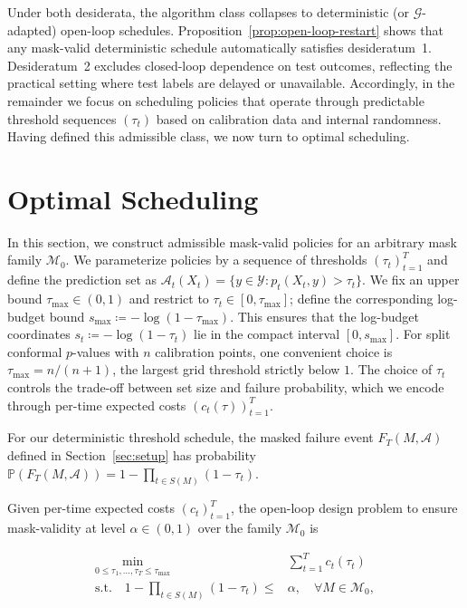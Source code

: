 \documentclass{uai2026} %
\newcommand{\1}{\mathbf{1}}
\newcommand{\prob}{\mathbb{P}}
\newcommand{\ycal}{\mathcal{Y}}
\newcommand{\G}{\mathcal{G}}
\newcommand{\mcal}{\mathcal{M}}
\newcommand{\acal}{\mathcal{A}}
\begin{document}
Under both desiderata, the algorithm class collapses to deterministic (or $\G$-adapted) open-loop schedules.
Proposition~\ref{prop:open-loop-restart} shows that any mask-valid deterministic schedule automatically satisfies desideratum~1.
Desideratum~2 excludes closed-loop dependence on test outcomes, reflecting the practical setting where test labels are delayed or unavailable.
Accordingly, in the remainder we focus on scheduling policies that operate through predictable threshold sequences $(\tau_t)$ based on calibration data and internal randomness.
Having defined this admissible class, we now turn to optimal scheduling.

\section{Optimal Scheduling}
\label{sec:finite}

In this section, we construct admissible mask-valid policies for an arbitrary mask family $\mcal_0$. We parameterize policies by a sequence of thresholds $(\tau_t)_{t=1}^{T}$ and define the prediction set as $\acal_t(X_t) = \{y \in \ycal : p_t(X_t, y) > \tau_t\}$. We fix an upper bound $\tau_{\max}\in(0,1)$ and restrict to $\tau_t\in[0,\tau_{\max}]$; define the corresponding log-budget bound $s_{\max}\coloneqq -\log(1-\tau_{\max})$. This ensures that the log-budget coordinates $s_t\coloneqq -\log(1-\tau_t)$ lie in the compact interval $[0,s_{\max}]$. For split conformal $p$-values with $n$ calibration points, one convenient choice is $\tau_{\max}=n/(n+1)$, the largest grid threshold strictly below $1$. The choice of $\tau_t$ controls the trade-off between set size and failure probability, which we encode through per-time expected costs $(c_t(\tau))_{t=1}^{T}$.

For our deterministic threshold schedule, the masked failure event $F_T(M, \acal)$ defined in Section~\ref{sec:setup} has probability $\prob(F_T(M, \acal)) = 1-\prod_{t\in S(M)}(1-\tau_t)$.

Given per-time expected costs $(c_t)_{t=1}^{T}$, the open-loop design problem to ensure mask-validity at level $\alpha\in(0,1)$ over the family $\mcal_{0}$ is

\begin{equation}
  \label{eq:design-problem}
  \begin{aligned}
    \min_{0 \le \tau_{1},\dots,\tau_{T}\le \tau_{\max}}\quad & \sum_{t=1}^{T} c_t(\tau_t)\\
    \text{s.t.}\quad 1-\prod_{t\in S(M)}(1-\tau_t)\le  & \alpha,\quad \forall M\in\mcal_{0},
  \end{aligned}
\end{equation}
\end{document}
